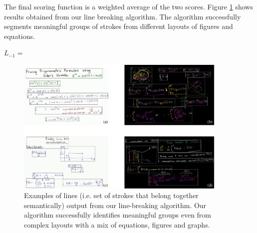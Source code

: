 The final scoring function is a weighted average of the two scores.
Figure \ref{Fig:line_examples} shows results obtained from our line breaking algorithm. The algorithm successfully segments meaningful groups of strokes from different layouts of figures and equations.


\begin{algorithm}[h]
\DontPrintSemicolon
\SetAlgoLined
\SetCommentSty{\tiny\ttfamily} 
  $L_{-1} =$ \string{\string} 
\label{Alg:line_break}
\end{algorithm}

\begin{figure}[h]
        \centering
        \includegraphics[width=0.9\textwidth]{images/example_lines}
        \caption{Examples of lines (i.e. set of strokes that belong together semantically) output from our line-breaking algorithm. Our algorithm successfully identifies meaningful groups even from complex layouts with a mix of equations, figures and graphs.}
        \label{Fig:line_examples}
\end{figure}

